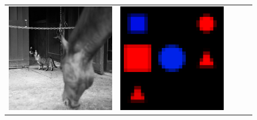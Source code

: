 \begin{figure}
\begin{tabular}{>{\raggedright}*{5}{p{.17\textwidth}}}
    \includegraphics[width=\linewidth]{fig/thumb/cocoqa4.jpg} &
    \includegraphics[width=\linewidth]{fig/bad_input_big} &

\end{tabular}
\end{figure}

